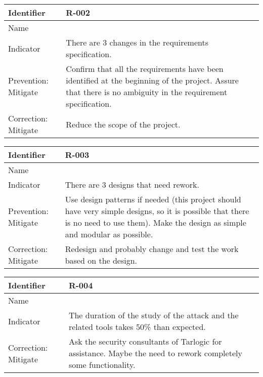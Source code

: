 \begin{table}[H]
	\begin{tabularx}{\textwidth}{|y|z|}
		\hline
		Identifier & \textbf{R-002} \\ \hline
		Name & \Rdos \\ \hline
		Indicator & There are 3 changes in the requirements specification.\\ \hline
		Prevention: Mitigate
			& Confirm that all the requirements have been identified at the beginning of the project.\linej
			 Assure that there is no ambiguity in the requirement specification.\\ \hline
		Correction: Mitigate
			& Reduce the scope of the project.  \\ \hline
	\end{tabularx}
\end{table}

\begin{table}[H]
	\begin{tabularx}{\textwidth}{|y|z|}
		\hline
		Identifier & \textbf{R-003} \\ \hline
		Name & \Rtres \\ \hline
		Indicator & There are 3 designs that need rework.\\ \hline
		Prevention: Mitigate
			& Use design patterns if needed (this project should have very simple designs, so it is possible that there is no need to use them). \linej
			 Make the design as simple and modular as possible. \\ \hline
		Correction: Mitigate
			& Redesign and probably change and test the work based on the design.\\ \hline
	\end{tabularx}
\end{table}

\begin{table}[H]
	\begin{tabularx}{\textwidth}{|y|z|}
		\hline
		Identifier & \textbf{R-004} \\ \hline
		Name & \Rcuatro \\ \hline
		Indicator & The duration of the study of the attack and the related tools takes 50\% than expected. \\ \hline
		Correction: Mitigate
			& Ask the security consultants of Tarlogic for assistance. \linej
			 Maybe the need to rework completely some functionality. \\ \hline
	\end{tabularx}
\end{table}

